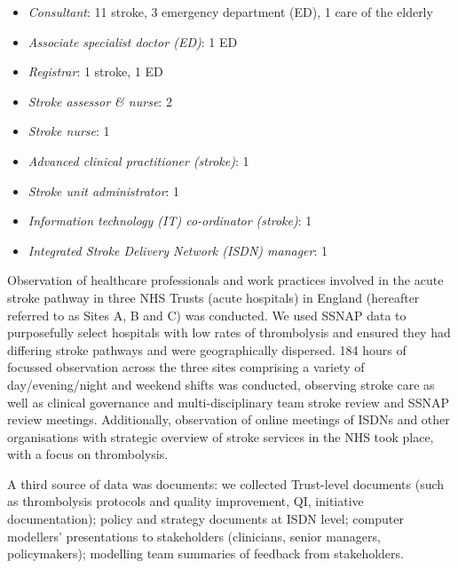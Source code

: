 \begin{itemize}

    \item \textit{Consultant}: 11 stroke, 3 emergency department (ED), 1 care of the elderly

    \item \textit{Associate specialist doctor (ED)}: 1 ED

    \item \textit{Registrar}: 1 stroke, 1 ED 

    \item \textit{Stroke assessor \& nurse}: 2

    \item \textit{Stroke nurse}: 1
    
    \item \textit{Advanced clinical practitioner (stroke)}: 1

    \item \textit{Stroke unit administrator}: 1

    \item \textit{Information technology (IT) co-ordinator (stroke)}: 1

    \item \textit{Integrated Stroke Delivery Network (ISDN) manager}: 1
    
\end{itemize}

Observation of healthcare professionals and work practices involved in the acute stroke pathway in three NHS Trusts (acute hospitals) in England (hereafter referred to as Sites A, B and C) was conducted. We used SSNAP data to purposefully select hospitals with low rates of thrombolysis and ensured they had differing stroke pathways and were geographically dispersed. 184 hours of focussed observation across the three sites comprising a variety of day/evening/night and weekend shifts was conducted, observing stroke care as well as clinical governance and multi-disciplinary team stroke review and SSNAP review meetings. Additionally, observation of online meetings of ISDNs and other organisations with strategic overview of stroke services in the NHS took place, with a focus on thrombolysis. 

A third source of data was documents: we collected Trust-level documents (such as thrombolysis protocols and quality improvement, QI, initiative documentation); policy and strategy documents at ISDN level; computer modellers’ presentations to stakeholders (clinicians, senior managers, policymakers); modelling team summaries of feedback from stakeholders.

